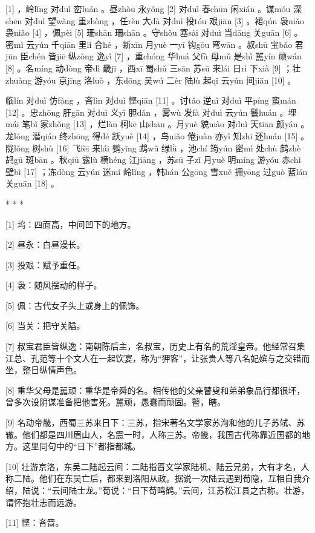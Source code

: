 \documentclass[12pt,UTF8]{ctexbook}
\begin{document}
[1] ，岭lǐng 对duì 峦luán 。昼zhòu 永yǒng [2] 对duì 春chūn 闲xián 。谋móu 深shēn 对duì 望wàng 重zhòng ，任rèn 大dà 对duì 投tóu 艰jiān [3] 。裙qún 袅niǎo 袅niǎo [4] ，佩pèi [5] 珊shān 珊shān 。守shǒu 塞sài 对duì 当dāng 关guān [6] 。密mì 云yún 千qiān 里lǐ 合hé ，新xīn 月yuè 一yī 钩gōu 弯wān 。叔shū 宝bǎo 君jūn 臣chén 皆jiē 纵zòng 逸yì [7] ，重chóng 华huá 父fù 母mǔ 是shì 嚚yín 顽wán [8] 。名míng 动dòng 帝dì 畿jī ，西xī 蜀shǔ 三sān 苏sū 来lái 日rì 下xià [9] ；壮zhuàng 游yóu 京jīng 洛luò ，东dōng 吴wú 二èr 陆lù 起qǐ 云yún 间jiān [10] 。

临lín 对duì 仿fǎng ，吝lìn 对duì 悭qiān [11] 。讨tǎo 逆nì 对duì 平píng 蛮mán [12] 。忠zhōng 肝gān 对duì 义yì 胆dǎn ，雾wù 发fà 对duì 云yún 鬟huán 。埋mái 笔bǐ 冢zhǒng [13] ，烂làn 柯kē 山shān 。月yuè 貌mào 对duì 天tiān 颜yán 。龙lóng 潜qián 终zhōng 得dé 跃yuè [14] ，鸟niǎo 倦juàn 亦yì 知zhī 还huán [15] 。陇lǒng 树shù [16] 飞fēi 来lái 鹦yīng 鹉wǔ 绿lǜ ，池chí 筠yún 密mì 处chù 鹧zhè 鸪gū 斑bān 。秋qiū 露lù 横héng 江jiāng ，苏sū 子zǐ 月yuè 明míng 游yóu 赤chì 壁bì [17] ；冻dòng 云yún 迷mí 岭lǐng ，韩hán 公gōng 雪xuě 拥yōng 过guò 蓝lán 关guān [18] 。



* * *



[1] 坞：四面高，中间凹下的地方。

[2] 昼永：白昼漫长。

[3] 投艰：赋予重任。

[4] 袅：随风摆动的样子。

[5] 佩：古代女子头上或身上的佩饰。

[6] 当关：把守关隘。

[7] 叔宝君臣皆纵逸：南朝陈后主，名叔宝，历史上有名的荒淫皇帝。他经常召集江总、孔范等十个文人在一起饮宴，称为“狎客”，让张贵人等八名妃嫔与之交错而坐，整日纵情声色。

[8] 重华父母是嚚顽：重华是帝舜的名。相传他的父亲瞽叟和弟弟象品行都很坏，曾多次设阴谋准备把他害死。嚚顽，愚蠢而顽固。瞽，瞎。

[9] 名动帝畿，西蜀三苏来日下：三苏，指宋著名文学家苏洵和他的儿子苏轼、苏辙。他们都是四川眉山人，名震一时，人称三苏。帝畿，我国古代称靠近国都的地方。这里同句中的“日下”都指都城。

[10] 壮游京洛，东吴二陆起云间：二陆指晋文学家陆机、陆云兄弟，大有才名，人称二陆。他们在东吴亡后，都来到洛阳从政。据说一次陆云遇到荀隐，互相自我介绍，陆说：“云间陆士龙。”荀说：“日下荀鸣鹤。”云间，江苏松江县之古称。壮游，谓怀抱壮志而远游。

[11] 悭：吝啬。
\end{document}
